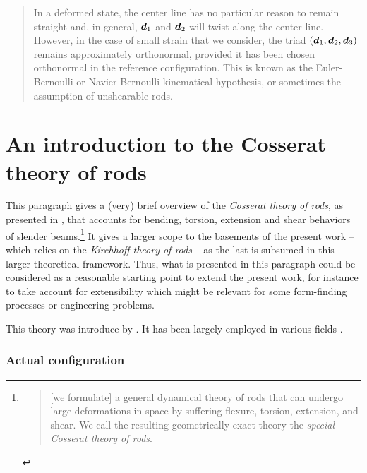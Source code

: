 \blockcquote[p.~68]{Audoly2010}{In a deformed state, the center line has no particular reason to remain straight and, in general, $\boldsymbol{d}_1$ and $\boldsymbol{d}_2$ will twist along the center line. However, in the case of small strain that we consider, the triad $(\boldsymbol{d}_1,\boldsymbol{d}_2,\boldsymbol{d}_3)$ remains approximately orthonormal, provided it has been chosen orthonormal in the reference configuration. This is known as the Euler-Bernoulli or Navier-Bernoulli kinematical hypothesis, or sometimes the assumption of unshearable rods.}

\section{An introduction to the Cosserat theory of rods}

This paragraph gives a (very) brief overview of the \emph{Cosserat theory of rods}, as presented in \cite{Antman2005}, that accounts for bending, torsion, extension and shear  behaviors of slender beams.\footnote{\blockcquote[p.~270]{Antman2005}{[we formulate] a general dynamical theory of rods that can undergo large deformations in space by suffering flexure, torsion, extension, and shear. We call the resulting geometrically exact theory the \emph{special Cosserat theory of rods}.}} It gives a larger scope to the basements of the present work -- which relies on the \emph{Kirchhoff theory of rods} -- as the last is subsumed in this larger theoretical framework. Thus, what is presented in this paragraph could be considered as a reasonable starting point to extend the present work, for instance to take account for extensibility which might be relevant for some form-finding processes or engineering problems.

This theory was introduce by \cite{Antman1974}. It has been largely employed in various fields \cite{Shi1995, Bergou2010}.

\subsubsection{Actual configuration}

